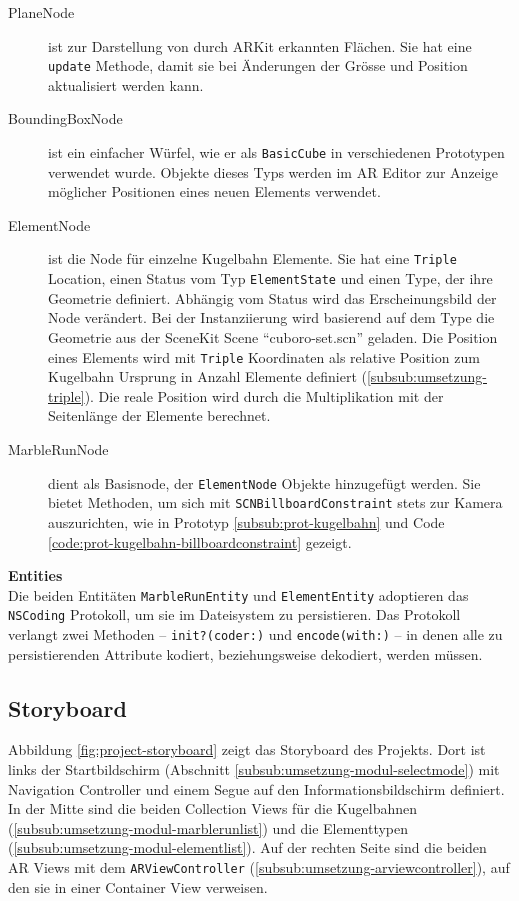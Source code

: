 \begin{description}
	\item[PlaneNode] ist zur Darstellung von durch ARKit erkannten Flächen. Sie hat eine \texttt{update} Methode, damit sie bei Änderungen der Grösse und Position aktualisiert werden kann.
	\item[BoundingBoxNode] ist ein einfacher Würfel, wie er als \texttt{BasicCube} in verschiedenen Prototypen verwendet wurde. Objekte dieses Typs werden im AR Editor zur Anzeige möglicher Positionen eines neuen Elements verwendet.
	\item[ElementNode] ist die Node für einzelne Kugelbahn Elemente. Sie hat eine \texttt{Triple} Location, einen Status vom Typ \texttt{ElementState} und einen Type, der ihre Geometrie definiert. Abhängig vom Status wird das Erscheinungsbild der Node verändert. Bei der Instanziierung wird basierend auf dem Type die Geometrie aus der SceneKit Scene "`cuboro-set.scn"' geladen. Die Position eines Elements wird mit \texttt{Triple} Koordinaten als relative Position zum Kugelbahn Ursprung in Anzahl Elemente definiert (\ref{subsub:umsetzung-triple}). Die reale Position wird durch die Multiplikation mit der Seitenlänge der Elemente berechnet.
	\item[MarbleRunNode] dient als Basisnode, der \texttt{ElementNode} Objekte hinzugefügt werden. Sie bietet Methoden, um sich mit \texttt{SCNBillboardConstraint} stets zur Kamera auszurichten, wie in Prototyp \ref{subsub:prot-kugelbahn} und Code \ref{code:prot-kugelbahn-billboardconstraint} gezeigt.
\end{description}

\textbf{Entities} \\
Die beiden Entitäten \texttt{MarbleRunEntity} und \texttt{ElementEntity} adoptieren das \texttt{NSCoding} Protokoll, um sie im Dateisystem zu persistieren.
Das Protokoll verlangt zwei Methoden – \texttt{init?(coder:)} und \texttt{encode(with:)} – in denen alle zu persistierenden Attribute kodiert, beziehungsweise dekodiert, werden müssen.


\subsection{Storyboard}


Abbildung \ref{fig:project-storyboard} zeigt das Storyboard des Projekts.
Dort ist links der Startbildschirm (Abschnitt \ref{subsub:umsetzung-modul-selectmode}) mit Navigation Controller und einem Segue auf den Informationsbildschirm definiert.
In der Mitte sind die beiden Collection Views für die Kugelbahnen (\ref{subsub:umsetzung-modul-marblerunlist}) und die Elementtypen (\ref{subsub:umsetzung-modul-elementlist}).
Auf der rechten Seite sind die beiden AR Views mit dem \texttt{ARViewController} (\ref{subsub:umsetzung-arviewcontroller}), auf den sie in einer Container View verweisen.


